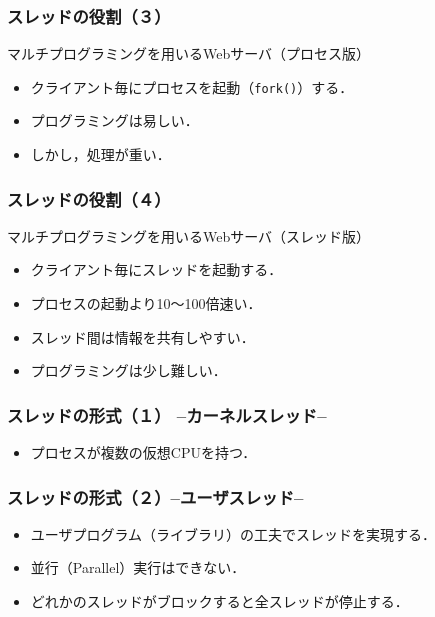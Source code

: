\documentclass[unicode]{beamer}                   %
\begin{document}
\begin{frame}
  \frametitle{スレッドの役割（３）}
  マルチプログラミングを用いるWebサーバ（プロセス版） \\
  \vfill
  \vfill
  \begin{itemize}
  \item クライアント毎にプロセスを起動（\texttt{fork()}）する．
  \item プログラミングは易しい．
  \item しかし，処理が重い．
  \end{itemize}
  \vfill
\end{frame}

\begin{frame}
  \frametitle{スレッドの役割（４）}
  マルチプログラミングを用いるWebサーバ（スレッド版） \\
  \vfill
  \vfill
  \begin{itemize}
  \item クライアント毎にスレッドを起動する．
  \item プロセスの起動より10〜100倍速い．
  \item スレッド間は情報を共有しやすい．
  \item プログラミングは少し難しい．
  \end{itemize}
  \vfill
\end{frame}

\begin{frame}
  \frametitle{スレッドの形式（１） --カーネルスレッド--}
  \vfill
  \vfill
  \begin{itemize}
  \item プロセスが複数の仮想CPUを持つ．
  \end{itemize}
  \vfill
\end{frame}

\begin{frame}
  \frametitle{スレッドの形式（２）--ユーザスレッド--}
  \vfill
  \vfill
  \begin{itemize}
  \item ユーザプログラム（ライブラリ）の工夫でスレッドを実現する．
  \item 並行（Parallel）実行はできない．
  \item どれかのスレッドがブロックすると全スレッドが停止する．
  \end{itemize}
  \vfill
\end{frame}
\end{document}
